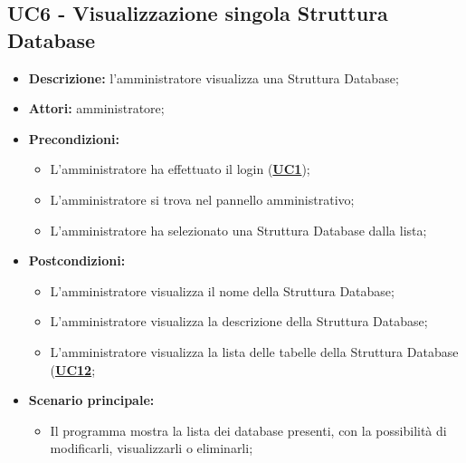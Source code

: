 \subsection{UC6 - Visualizzazione singola Struttura Database}
\label{sec:UC6}
\begin{itemize}
	\item \textbf{Descrizione:} l’amministratore visualizza una Struttura Database;
	\item \textbf{Attori:} amministratore;
	\item \textbf{Precondizioni:} 
	\begin{itemize}
		\item L’amministratore ha effettuato il login (\hyperref[sec:UC1]{\textbf{UC1}});
		\item L’amministratore si trova nel pannello amministrativo;
		\item L'amministratore ha selezionato una Struttura Database dalla lista;
	\end{itemize}
	\item \textbf{Postcondizioni:} 
	\begin{itemize}
		\item L'amministratore visualizza il nome della Struttura Database;
		\item L'amministratore visualizza la descrizione della Struttura Database;
		\item L'amministratore visualizza la lista delle tabelle della Struttura Database  (\hyperref[sec:UC12]{\textbf{UC12}};
	\end{itemize}
	\item \textbf{Scenario principale:} 
	\begin{itemize}
		\item Il programma mostra la lista dei database presenti, con la possibilità di modificarli, visualizzarli o eliminarli;
	\end{itemize}
\end{itemize}


